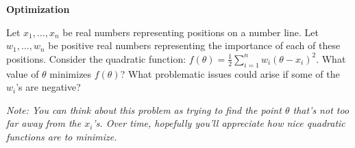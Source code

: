 \item {} {\bf Optimization}

Let $x_1, \dots, x_n$ be real numbers representing positions on a number line.
Let $w_1, \dots, w_n$ be positive real numbers representing the importance of
each of these positions. Consider the quadratic function:
$f(\theta) = \frac{1}{2} \sum_{i=1}^n w_i (\theta - x_i)^2$.
What value of $\theta$ minimizes $f(\theta)$? What problematic issues could
arise if some of the $w_i$'s are negative?

{\em Note: You can think about this problem as trying to find the point $\theta$
that's not too far away from the $x_i$'s. Over time, hopefully you'll appreciate
how nice quadratic functions are to minimize.}
